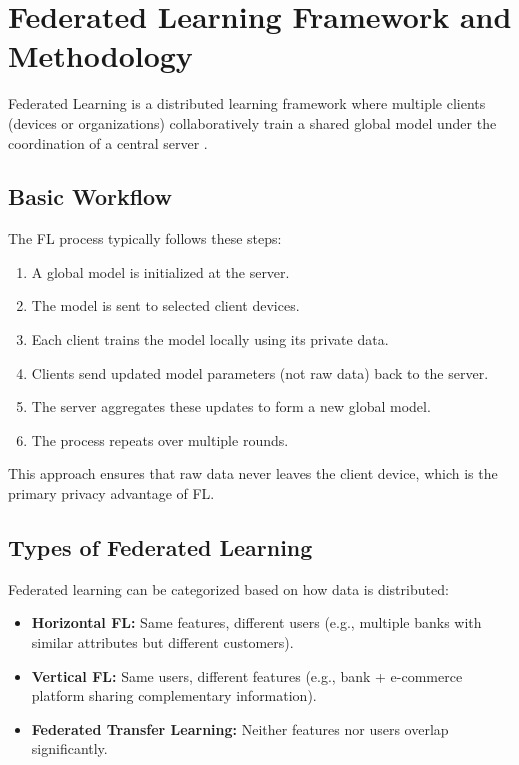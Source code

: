 
\chapter{Federated Learning Framework and Methodology}
\label{ch:chapter2}

Federated Learning is a distributed learning framework where multiple clients (devices or organizations) collaboratively train a shared global model under the coordination of a central server \cite{mcmahan2017communication}.

\section{Basic Workflow}

The FL process typically follows these steps:

\begin{enumerate}
    \item A global model is initialized at the server.
    \item The model is sent to selected client devices.
    \item Each client trains the model locally using its private data.
    \item Clients send updated model parameters (not raw data) back to the server.
    \item The server aggregates these updates to form a new global model.
    \item The process repeats over multiple rounds.
\end{enumerate}

This approach ensures that raw data never leaves the client device, which is the primary privacy advantage of FL.

\section{Types of Federated Learning}

Federated learning can be categorized based on how data is distributed:

\begin{itemize}
    \item \textbf{Horizontal FL:} Same features, different users (e.g., multiple banks with similar attributes but different customers).
    \item \textbf{Vertical FL:} Same users, different features (e.g., bank + e-commerce platform sharing complementary information).
    \item \textbf{Federated Transfer Learning:} Neither features nor users overlap significantly.
\end{itemize}

